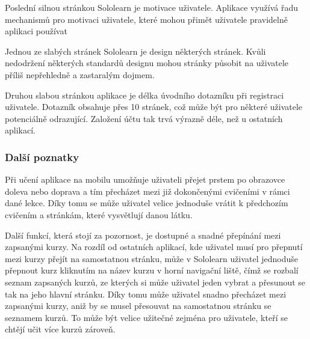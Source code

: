 Poslední silnou stránkou Sololearn je motivace uživatele. Aplikace využívá řadu mechanismů pro motivaci uživatele, které mohou přimět uživatele pravidelně aplikaci používat 

Jednou ze slabých stránek Sololearn je design některých stránek. Kvůli nedodržení některých standardů designu mohou stránky působit na uživatele příliš nepřehledně a zastaralým dojmem.

Druhou slabou stránkou aplikace je délka úvodního dotazníku při registraci uživatele. Dotazník obsahuje přes 10 stránek, což může být pro některé uživatele potenciálně odrazující. Založení účtu tak trvá výrazně déle, než u ostatních aplikací. 

\subsubsection{Další poznatky}


Při učení aplikace na mobilu umožňuje uživateli přejet prstem po obrazovce doleva nebo doprava a tím přecházet mezi již dokončenými cvičeními v rámci dané lekce. Díky tomu se může uživatel velice jednoduše vrátit k předchozím cvičením a stránkám, které vysvětlují danou látku.

Další funkcí, která stojí za pozornost, je dostupné a snadné přepínání mezi zapsanými kurzy. Na rozdíl od ostatních aplikací, kde uživatel musí pro přepnutí mezi kurzy přejít na samostatnou stránku, může v Sololearn uživatel jednoduše přepnout kurz kliknutím na název kurzu v horní navigační liště, čímž se rozbalí seznam zapsaných kurzů, ze kterých si může uživatel jeden vybrat a přesunout se tak na jeho hlavní stránku. Díky tomu může uživatel snadno přecházet mezi zapsanými kurzy, aniž by se musel přesouvat na samostatnou stránku se seznamem kurzů. To může být velice užitečné zejména pro uživatele, kteří se chtějí učit více kurzů zároveň.  
